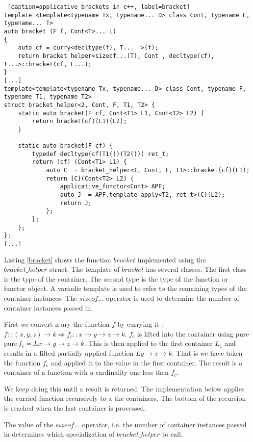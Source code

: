 \documentclass[12pt,fleqn]{article}
\begin{document}
%
%
%
\begin {lstlisting} [caption=applicative brackets in c++, label=bracket]
template <template<typename Tx, typename... D> class Cont, typename F, typename... T> 
auto bracket (F f, Cont<T>... L) 
{
	auto cf = curry<decltype(f), T...  >(f);	
	return bracket_helper<sizeof...(T), Cont , decltype(cf), T...>::bracket(cf, L...);
} 
[...]
template<template<typename Tx, typename... D> class Cont, typename F, typename T1, typename T2>
struct bracket_helper<2, Cont, F, T1, T2> {
	static auto bracket(F cf, Cont<T1> L1, Cont<T2> L2) {
		return bracket(cf)(L1)(L2);
	}

	static auto bracket(F cf) {
		typedef decltype(cf(T1())(T2())) ret_t;
		return [cf] (Cont<T1> L1) {
			auto C  = bracket_helper<1, Cont, F, T1>::bracket(cf)(L1);
			return [C](Cont<T2> L2) { 
				applicative_functor<Cont> APF;
				auto J  = APF.template apply<T2, ret_t>(C)(L2);
				return J;
			};
		};
	};
};
[...]
\end{lstlisting}
%
%
%
%
%

Listing \ref{bracket} shows the function $bracket$ implemented using the $bracket\_helper$ struct. 
The template of $bracket$ has several classes.
The first class is the type of the container. The second type is the type of the function or functor object.
A variadic template is used to refer to the remaining types of the container instances. 
The $sizeof...$ operator is used to determine the number of container instances passed in.


First we convert n-ary the function $f$ by currying it : $f::(x,y,z) \rightarrow k \Rightarrow f_c::x \rightarrow y \rightarrow z \rightarrow k$. 
$f_c$ is lifted into the container using pure $ \mbox{pure} \, f_c = L x \rightarrow y \rightarrow z \rightarrow k$. 
This is  then applied to the first container $L_1$ and results in a lifted partially applied function $L y \rightarrow z \rightarrow k$. 
That is we have taken the function $f_c$ and applied it to the value in the first container. The result is a container of a function 
with a cardinality one less then $f_c$.

We keep doing this until a result is returned.
The implementation below applies the curried function recursively to a the containers. 
The bottom of the recursion is reached when the last container is processed.

The value of the $sizeof...$ operator, i.e. the number of container instances passed in determines which specialization of  
$bracket\_helper$ to call.
\end{document}
